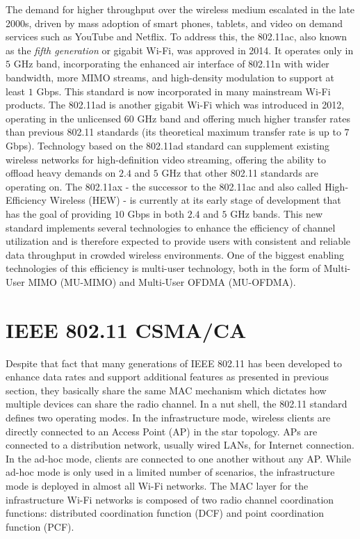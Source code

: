 The demand for higher throughput over the wireless medium escalated in the late 2000s, driven by mass adoption of smart phones, tablets, and video on demand services such as YouTube and Netflix. To address this, the 802.11ac, also known as the \textit{fifth generation} or gigabit Wi-Fi, was approved in 2014. It operates only in $5$ GHz band, incorporating the enhanced air interface of 802.11n with wider bandwidth, more MIMO streams, and high-density modulation to support at least $1$ Gbps. This standard is now incorporated in many mainstream Wi-Fi products. The 802.11ad is another gigabit Wi-Fi which was introduced in 2012, operating in the unlicensed $60$ GHz band and offering much higher transfer rates than previous 802.11 standards (its theoretical maximum transfer rate is up to $7$ Gbps). Technology based on the 802.11ad standard can supplement existing wireless networks for high-definition video streaming, offering the ability to offload heavy demands on $2.4$ and $5$ GHz that other 802.11 standards are operating on. The 802.11ax - the successor to the 802.11ac and also called  High-Efficiency Wireless (HEW) - is currently at its early stage of development that has the goal of providing $10$ Gbps in both $2.4$ and $5$ GHz bands. This new standard implements several technologies to enhance the efficiency of channel utilization and is therefore expected to provide users with consistent and reliable data throughput in crowded wireless environments. One of the biggest enabling technologies of this efficiency is multi-user technology, both in the form of Multi-User MIMO (MU-MIMO) and Multi-User OFDMA (MU-OFDMA).


\section{IEEE 802.11 CSMA/CA}
\label{csma}

Despite that fact that many generations of IEEE 802.11 has been developed to enhance data rates and support additional features as presented in previous section, they basically share the same MAC mechanism which dictates how multiple devices can share the radio channel. In a nut shell, the 802.11 standard defines two operating modes. In the infrastructure mode, wireless clients are directly connected to an Access Point (AP) in the star topology. APs are connected to a distribution network, usually wired LANs, for Internet connection. In the ad-hoc mode, clients are connected to one another without any AP. While ad-hoc mode is only used in a limited number of scenarios, the infrastructure mode is deployed in almost all Wi-Fi networks. The MAC layer for the infrastructure Wi-Fi networks is composed of two radio channel coordination functions: distributed coordination function (DCF) and point coordination function (PCF).

